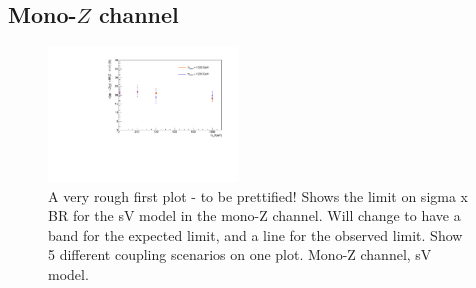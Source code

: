 \subsection{Mono-$Z$ channel}

\begin{figure}
\begin{center}
\includegraphics[width=0.45\textwidth]{figures/monoZ_sigma_limits_variedDMmass.pdf}
\caption{A very rough first plot - to be prettified! Shows the limit on sigma x BR for the sV model in the mono-Z channel. Will change to have a band for the expected limit, and a line for the observed limit. Show 5 different coupling scenarios on one plot. Mono-Z channel, sV model.}
\label{fig:MonoZ_SVD_limit}
\end{center}
\end{figure}

